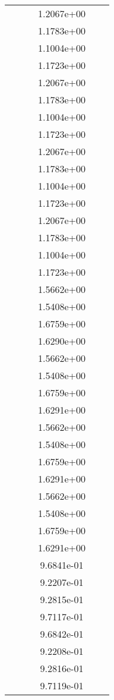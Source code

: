 \begin{xltabular}{\textwidth}{r|rS[table-format=1.3e+2]S[table-format=1.4e+2]S[table-format=1.4e+2]S[table-format=-1.5]}
&  &  & 1.2067e+00 & & \\
&  &  & 1.1783e+00 & & \\
&  &  & 1.1004e+00 & & \\
&  &  & 1.1723e+00 & & \\
&  &  & 1.2067e+00 & & \\
&  &  & 1.1783e+00 & & \\
&  &  & 1.1004e+00 & & \\
&  &  & 1.1723e+00 & & \\
&  &  & 1.2067e+00 & & \\
&  &  & 1.1783e+00 & & \\
&  &  & 1.1004e+00 & & \\
&  &  & 1.1723e+00 & & \\
&  &  & 1.2067e+00 & & \\
&  &  & 1.1783e+00 & & \\
&  &  & 1.1004e+00 & & \\
&  &  & 1.1723e+00 & & \\
&  &  & 1.5662e+00 & & \\
&  &  & 1.5408e+00 & & \\
&  &  & 1.6759e+00 & & \\
&  &  & 1.6290e+00 & & \\
&  &  & 1.5662e+00 & & \\
&  &  & 1.5408e+00 & & \\
&  &  & 1.6759e+00 & & \\
&  &  & 1.6291e+00 & & \\
&  &  & 1.5662e+00 & & \\
&  &  & 1.5408e+00 & & \\
&  &  & 1.6759e+00 & & \\
&  &  & 1.6291e+00 & & \\
&  &  & 1.5662e+00 & & \\
&  &  & 1.5408e+00 & & \\
&  &  & 1.6759e+00 & & \\
&  &  & 1.6291e+00 & & \\
&  &  & 9.6841e-01 & & \\
&  &  & 9.2207e-01 & & \\
&  &  & 9.2815e-01 & & \\
&  &  & 9.7117e-01 & & \\
&  &  & 9.6842e-01 & & \\
&  &  & 9.2208e-01 & & \\
&  &  & 9.2816e-01 & & \\
&  &  & 9.7119e-01 & & \\

\end{xltabular}
